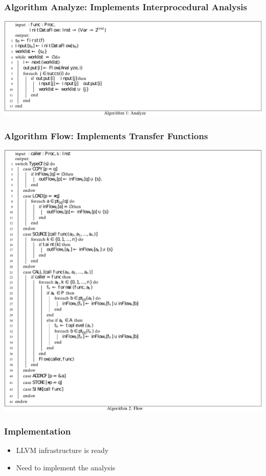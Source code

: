 \documentclass[xcolor=dvipsnames]{beamer}
\begin{document}
\begin{frame}
  \frametitle{Algorithm Analyze: Implements Interprocedural Analysis} 
    {\small
	\begin{center}
	\includegraphics[scale=0.65]{analyze}
	\end{center}   
	}
\end{frame}

\begin{frame}
  \frametitle{Algorithm Flow: Implements Transfer Functions} 
    {\small
	\begin{center}
	\includegraphics[scale=0.45]{flow}
	\end{center}   
	}
\end{frame}

\begin{frame}
  \frametitle{Implementation} {
   \Large
	\begin{itemize}
	\item LLVM infrastructure is ready
	\vspace{0.5cm}
	\item Need to implement the analysis	
	\end{itemize}   
	}
\end{frame}
\end{document}
